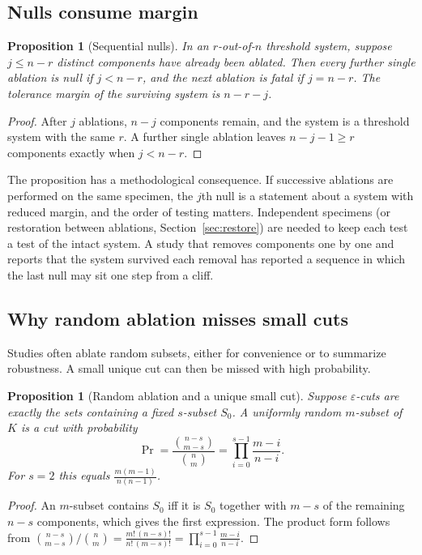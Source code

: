 \documentclass[11pt]{article}
\newtheorem{proposition}[theorem]{Proposition}
\theoremstyle{definition}
\theoremstyle{remark}
\begin{document}
\subsection{Nulls consume margin}

\begin{proposition}[Sequential nulls]\label{prop:consume}
In an $r$-out-of-$n$ threshold system, suppose $j\le n-r$ distinct components have already been ablated. Then every further single ablation is null if $j<n-r$, and the next ablation is fatal if $j=n-r$. The tolerance margin of the surviving system is $n-r-j$.
\end{proposition}
\begin{proof}
After $j$ ablations, $n-j$ components remain, and the system is a threshold system with the same $r$. A further single ablation leaves $n-j-1\ge r$ components exactly when $j<n-r$.
\end{proof}

The proposition has a methodological consequence. If successive ablations are performed on the same specimen, the $j$th null is a statement about a system with reduced margin, and the order of testing matters. Independent specimens (or restoration between ablations, Section~\ref{sec:restore}) are needed to keep each test a test of the intact system. A study that removes components one by one and reports that the system survived each removal has reported a sequence in which the last null may sit one step from a cliff.

\subsection{Why random ablation misses small cuts}

Studies often ablate random subsets, either for convenience or to summarize robustness. A small unique cut can then be missed with high probability.

\begin{proposition}[Random ablation and a unique small cut]\label{prop:random}
Suppose $\varepsilon$-cuts are exactly the sets containing a fixed $s$-subset $S_0$. A uniformly random $m$-subset of $K$ is a cut with probability
\[
\Pr=\frac{\binom{n-s}{m-s}}{\binom nm}=\prod_{i=0}^{s-1}\frac{m-i}{n-i}.
\]
For $s=2$ this equals $\frac{m(m-1)}{n(n-1)}$.
\end{proposition}
\begin{proof}
An $m$-subset contains $S_0$ iff it is $S_0$ together with $m-s$ of the remaining $n-s$ components, which gives the first expression. The product form follows from $\binom{n-s}{m-s}/\binom nm=\frac{m!\,(n-s)!}{n!\,(m-s)!}=\prod_{i=0}^{s-1}\frac{m-i}{n-i}$.
\end{proof}
\end{document}
